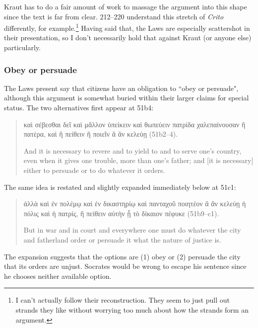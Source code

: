 \documentclass[12pt,letterpaper]{article}
\begin{document}
Kraut has to do a fair amount of work to massage the argument into this shape since the text is far from clear. \cite{brickhouse-smith2004-plato-trial-of-socrates} 212--220 understand this stretch of \textit{Crito} differently, for example.\footnote{I can't actually follow their reconstruction. They seem to just pull out strands they like without worrying too much about how the strands form an argument.}  Having said that, the Laws are especially scattershot in their presentation, so I don't necessarily hold that against Kraut (or anyone else) particularly.


\subsubsection*{Obey or persuade}

The Laws present say that citizens have an obligation to ``obey or persuade", although this argument is somewhat buried within their larger claims for special status. The two alternatives first appear at 51b4:

\begin{quote}

    \textgreek{καὶ σέβεσθαι δεῖ καὶ μᾶλλον ὑπείκειν καὶ θωπεύειν πατρίδα χαλεπαίνουσαν ἢ πατέρα, καὶ ἢ πείθειν ἢ ποιεῖν ἃ ἂν κελεύῃ} (51b2--4).

    And it is necessary to revere and to yield to and to serve one's country, even when it gives one trouble, more than one's father; and [it is necessary] either to persuade or to do whatever it orders.

\end{quote}

The same idea is restated and slightly expanded immediately below at 51c1:

\begin{quote}

    \textgreek{ἀλλὰ καὶ ἐν πολέμῳ καὶ ἐν δικαστηρίῳ καὶ πανταχοῦ ποιητέον ἃ ἂν κελεύῃ ἡ πόλις καὶ ἡ πατρίς, ἢ πείθειν αὐτὴν ᾗ τὸ δίκαιον πέφυκε} (51b9--c1).

    But in war and in court and everywhere one must do whatever the city and fatherland order or persuade it what the nature of justice is.

\end{quote}

The expansion suggests that the options are (1) obey or (2) persuade the city that its orders are unjust. Socrates would be wrong to escape his sentence since he chooses neither available option.
\end{document}
